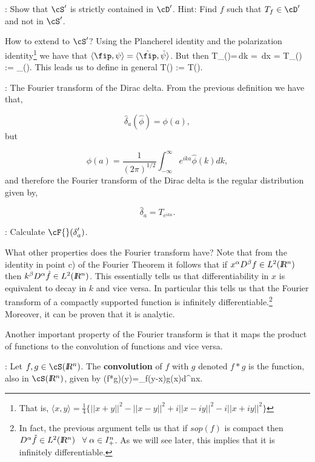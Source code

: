 \ejer:
Show that $\cS'$ is strictly contained in $\cD'$. Hint: Find $f$ such that $T_f\in\cD'$ and not in $\cS'$.

How to extend \cF{} to $\cS'$? 
Using the Plancherel identity and the polarization identity\footnote{That is, $\langle x,y \rangle = \frac14 \{ ||x+y||^2 -
||x-y||^2 + i ||x-iy||^2 - i ||x+iy||^2 \}$ }
we have that $\langle \fip,\psi \rangle = \langle \hat{\fip},\hat\psi \rangle$.
But then 
\beq
T_{\hat\sigma}(\hat{\psi})=\int\hat\sigma\,\hat\psi\;dk =
\int \sigma\,\psi\;dx = T_{\sigma}(\psi) := 
_{\sigma}(\hat{\psi}).
\eeq
\noi
This leads us to define in general
\beq
\hat T(\hat{\fip}) := T({\fip}).
\eeq

\ejem: The Fourier transform of the Dirac delta.
%
From the previous definition we have that,

\[
\hat{\delta}_{a} (\hat{\phi}) = \phi(a),
\]
%
but 

\[
\phi(a) = \frac1{(2\pi)^{1/2}} \int_{-\infty}^{\infty} e^{ika} \hat{\phi}(k) dk,
\]
%
and therefore the Fourier transform of the Dirac delta is the regular distribution given by,

\[
\hat{\delta}_{a} = T_{e^{ika}}.
\]

\ejer:
Calculate $\cF{}(\del'_a)$.


What other properties does the Fourier transform have?
Note that from the identity in point c) of the Fourier Theorem it follows
that if $x^{\alpha}D^{\beta}f\in L^2(\mbox{\sl {l$\!\!\!\;\:\!$R}$^n$}{})$ then $k^{\beta
}D^{\alpha}\hat f\in L^2(\mbox{\sl {l$\!\!\!\;\:\!$R}$^n$}{})$. This essentially tells us that 
differentiability
in $x$ is equivalent to decay in $k$ and vice versa. In particular
this tells us that the Fourier transform of a compactly supported function is infinitely differentiable.\footnote{
In fact, the previous argument tells us that if $sop(f)$ is
compact then $D^{\alpha}\hat f\in L^2(\mbox{\sl {l$\!\!\!\;\:\!$R}$^n$}{})\;\;\;\forall\;\alpha\in I_+^n$. 
As we will see later, this implies that it is
infinitely differentiable.}
Moreover, it can be proven that it is analytic.

Another important property of the Fourier transform is that
it maps the product of functions to the convolution of functions and vice versa.

:
Let $f,g\in\cS(\ren{})$. The {\bf convolution} of $f$ with $g$ 
denoted $f*g$ is the
function, also in $\cS(\ren{})$, given by
\beq
(f*g)(y)=\int_{\ren{}}f(y-x)\:g(x)\;d^nx.
\eeq

